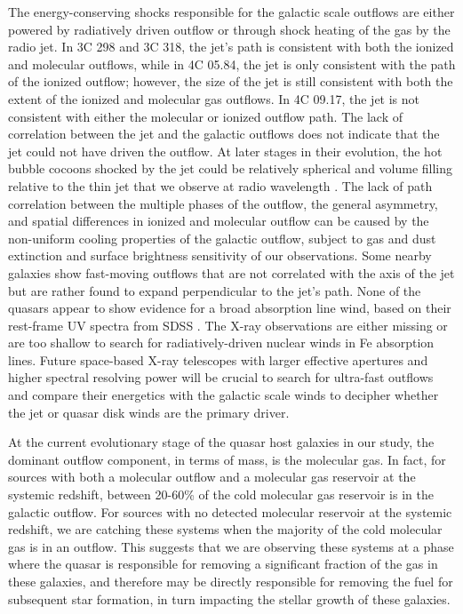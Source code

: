 \documentclass[twocolumn]{aastex63}
\begin{document}
The energy-conserving shocks responsible for the galactic scale outflows are either powered by radiatively driven outflow or through shock heating of the gas by the radio jet. In 3C 298 and 3C 318, the jet's path is consistent with both the ionized and molecular outflows, while in 4C 05.84, the jet is only consistent with the path of the ionized outflow; however, the size of the jet is still consistent with both the extent of the ionized and molecular gas outflows. In 4C 09.17, the jet is not consistent with either the molecular or ionized outflow path. The lack of correlation between the jet and the galactic outflows does not indicate that the jet could not have driven the outflow. At later stages in their evolution, the hot bubble cocoons shocked by the jet could be relatively spherical and volume filling relative to the thin jet that we observe at radio wavelength \citep{Wagner12,Mukherjee16}. The lack of path correlation between the multiple phases of the outflow, the general asymmetry, and spatial differences in ionized and molecular outflow can be caused by the non-uniform cooling properties of the galactic outflow, subject to gas and dust extinction and surface brightness sensitivity of our observations. Some nearby galaxies show fast-moving outflows that are not correlated with the axis of the jet \citep{Venturi21} but are rather found to expand perpendicular to the jet's path. None of the quasars appear to show evidence for a broad absorption line wind, based on their rest-frame UV spectra from SDSS \citep{Paris18}. The X-ray observations are either missing or are too shallow to search for radiatively-driven nuclear winds in Fe absorption lines. Future space-based X-ray telescopes with larger effective apertures and higher spectral resolving power will be crucial to search for ultra-fast outflows and compare their energetics with the galactic scale winds to decipher whether the jet or quasar disk winds are the primary driver.

At the current evolutionary stage of the quasar host galaxies in our study, the dominant outflow component, in terms of mass, is the molecular gas. In fact, for sources with both a molecular outflow and a molecular gas reservoir at the systemic redshift, between 20-60\% of the cold molecular gas reservoir is in the galactic outflow. For sources with no detected molecular reservoir at the systemic redshift, we are catching these systems when the majority of the cold molecular gas is in an outflow. This suggests that we are observing these systems at a phase where the quasar is responsible for removing a significant fraction of the gas in these galaxies, and therefore may be directly responsible for removing the fuel for subsequent star formation, in turn impacting the stellar growth of these galaxies.
\end{document}

